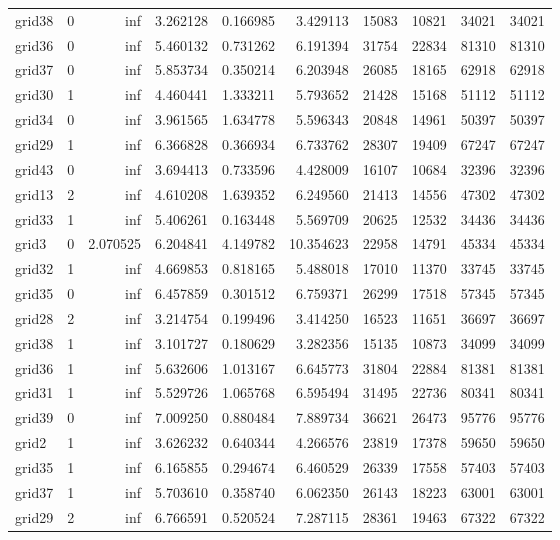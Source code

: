\begin{longtable}{|l|r|r|r|r|r|r|r|r|r|}
grid38 & 0 & inf & 3.262128 & 0.166985 & 3.429113 & 15083 & 10821 & 34021 & 34021 \\
grid36 & 0 & inf & 5.460132 & 0.731262 & 6.191394 & 31754 & 22834 & 81310 & 81310 \\
grid37 & 0 & inf & 5.853734 & 0.350214 & 6.203948 & 26085 & 18165 & 62918 & 62918 \\
grid30 & 1 & inf & 4.460441 & 1.333211 & 5.793652 & 21428 & 15168 & 51112 & 51112 \\
grid34 & 0 & inf & 3.961565 & 1.634778 & 5.596343 & 20848 & 14961 & 50397 & 50397 \\
grid29 & 1 & inf & 6.366828 & 0.366934 & 6.733762 & 28307 & 19409 & 67247 & 67247 \\
grid43 & 0 & inf & 3.694413 & 0.733596 & 4.428009 & 16107 & 10684 & 32396 & 32396 \\
grid13 & 2 & inf & 4.610208 & 1.639352 & 6.249560 & 21413 & 14556 & 47302 & 47302 \\
grid33 & 1 & inf & 5.406261 & 0.163448 & 5.569709 & 20625 & 12532 & 34436 & 34436 \\
grid3 & 0 & 2.070525 & 6.204841 & 4.149782 & 10.354623 & 22958 & 14791 & 45334 & 45334 \\
grid32 & 1 & inf & 4.669853 & 0.818165 & 5.488018 & 17010 & 11370 & 33745 & 33745 \\
grid35 & 0 & inf & 6.457859 & 0.301512 & 6.759371 & 26299 & 17518 & 57345 & 57345 \\
grid28 & 2 & inf & 3.214754 & 0.199496 & 3.414250 & 16523 & 11651 & 36697 & 36697 \\
grid38 & 1 & inf & 3.101727 & 0.180629 & 3.282356 & 15135 & 10873 & 34099 & 34099 \\
grid36 & 1 & inf & 5.632606 & 1.013167 & 6.645773 & 31804 & 22884 & 81381 & 81381 \\
grid31 & 1 & inf & 5.529726 & 1.065768 & 6.595494 & 31495 & 22736 & 80341 & 80341 \\
grid39 & 0 & inf & 7.009250 & 0.880484 & 7.889734 & 36621 & 26473 & 95776 & 95776 \\
grid2 & 1 & inf & 3.626232 & 0.640344 & 4.266576 & 23819 & 17378 & 59650 & 59650 \\
grid35 & 1 & inf & 6.165855 & 0.294674 & 6.460529 & 26339 & 17558 & 57403 & 57403 \\
grid37 & 1 & inf & 5.703610 & 0.358740 & 6.062350 & 26143 & 18223 & 63001 & 63001 \\
grid29 & 2 & inf & 6.766591 & 0.520524 & 7.287115 & 28361 & 19463 & 67322 & 67322 \\

\end{longtable}
